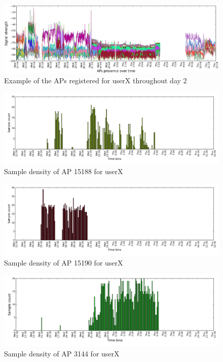 \begin{figure}[!h]
\centering
\includegraphics[width =\textwidth]{figures/combinations/user_6_sorted_1days_plot_croped.png}
\caption{Example of the APs registered for userX throughout day 2}
\label{rssi_6_2nd_day_A}
\end{figure}

\begin{figure}[!h]
\centering
\includegraphics[width =\textwidth]{figures/combinations/ap_15188_histo.png}
\caption{Sample density of AP 15188 for userX}
\label{samples_6_2nd_day_1_A}
\end{figure}

\begin{figure}[!h]
\centering
\includegraphics[width =\textwidth]{figures/combinations/ap_15190_histo.png}
\caption{Sample density of AP 15190 for userX}
\label{samples_6_2nd_day_2_A}
\end{figure}

\begin{figure}[!h]
\centering
\includegraphics[width =\textwidth]{figures/combinations/ap_3144_histo.png}
\caption{Sample density of AP 3144 for userX}
\label{samples_6_2nd_day_3_A}
\end{figure}

